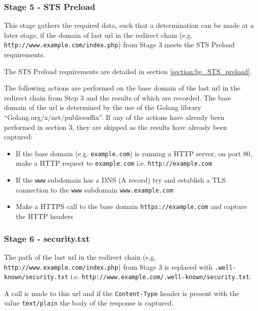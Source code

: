 \documentclass{mscreport}
\begin{document}
\subsubsection{Stage 5 - STS Preload}
\label{subsection:stage_5_STS}

This stage gathers the required data, such that a determination can be made at a later stage, if the domain of last url in the redirect chain (e.g. \texttt{http://www.example.com/index.php}) from Stage 3 meets the STS Preload requirements.

\vspace{0.3cm} \noindent
The STS Preload requirements are detailed in section \ref{section:bg_STS_preload}.

\vspace{0.3cm} \noindent
The following actions are performed on the base domain of the last url in the redirect chain from Step 3 and the results of which are recorded. The base domain of the url is determined by the use of the Golang library ``Golang.org/x/net/publicsuffix''. If any of the actions have already been performed in section 3, they are skipped as the results have already been captured:

\begin{itemize}
	\setlength\itemsep{0.1em}
    \item If the base domain (e.g. \texttt{example.com}) is running a HTTP server, on port 80, make a HTTP request to \texttt{example.com} i.e. \texttt{http://example.com}
    \item If the \texttt{www} subdomain has a DNS (A record) try and establish a TLS connection to the \texttt{www} subdomain \texttt{www.example.com}
    \item Make a HTTPS call to the base domain \texttt{https://example.com} and capture the HTTP headers
\end{itemize}


\subsubsection{Stage 6 - security.txt}

The path of the last url in the redirect chain (e.g. \texttt{http://www.example.com/index.php}) from Stage 3 is replaced with \texttt{.well-known/security.txt} i.e. \newline \texttt{http://www.example.com/.well-known/security.txt}.

\vspace{0.3cm} \noindent
A call is made to this url and if the \texttt{Content-Type} header is present with the value \texttt{text/plain} the body of the response is captured.
\end{document}
